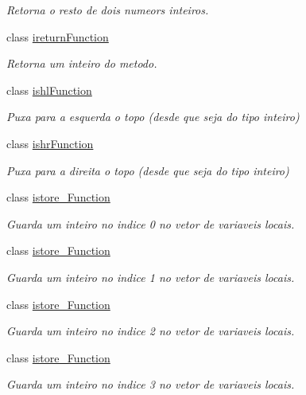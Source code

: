 \begin{DoxyCompactItemize}
\begin{DoxyCompactList}\small\item\em Retorna o resto de dois numeors inteiros. \end{DoxyCompactList}\item 
class \hyperlink{classInstruction_1_1ireturnFunction}{ireturn\+Function}
\begin{DoxyCompactList}\small\item\em Retorna um inteiro do metodo. \end{DoxyCompactList}\item 
class \hyperlink{classInstruction_1_1ishlFunction}{ishl\+Function}
\begin{DoxyCompactList}\small\item\em Puxa para a esquerda o topo (desde que seja do tipo inteiro) \end{DoxyCompactList}\item 
class \hyperlink{classInstruction_1_1ishrFunction}{ishr\+Function}
\begin{DoxyCompactList}\small\item\em Puxa para a direita o topo (desde que seja do tipo inteiro) \end{DoxyCompactList}\item 
class \hyperlink{classInstruction_1_1istore__0Function}{istore\+\_\+Function}
\begin{DoxyCompactList}\small\item\em Guarda um inteiro no indice 0 no vetor de variaveis locais. \end{DoxyCompactList}\item 
class \hyperlink{classInstruction_1_1istore__1Function}{istore\+\_\+Function}
\begin{DoxyCompactList}\small\item\em Guarda um inteiro no indice 1 no vetor de variaveis locais. \end{DoxyCompactList}\item 
class \hyperlink{classInstruction_1_1istore__2Function}{istore\+\_\+Function}
\begin{DoxyCompactList}\small\item\em Guarda um inteiro no indice 2 no vetor de variaveis locais. \end{DoxyCompactList}\item 
class \hyperlink{classInstruction_1_1istore__3Function}{istore\+\_\+Function}
\begin{DoxyCompactList}\small\item\em Guarda um inteiro no indice 3 no vetor de variaveis locais. \end{DoxyCompactList}\item 

\end{DoxyCompactItemize}
